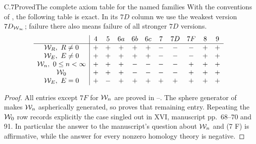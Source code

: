 \begin{claim}{C.7}{Proved}{The complete axiom table for the named families}
With the conventions of , the following table is exact.
In its $7D$ column we use the weakest version
$7D_{\mathcal{W}_{\infty}}$; failure there also means failure of all stronger
$7D$ versions.
\[
\begin{array}{c|cccccccccc}
 &4&5&6a&6b&6c&7&7D&7F&8&9\\\hline
\W_R,\ R\ne0&+&+&+&+&+&-&-&-&+&+\\
\W_E,\ E\ne0&+&+&+&+&+&-&-&-&+&+\\
\W_n,\ 0\leq n<\infty&+&+&+&-&-&-&-&+&+&+\\
\W_0&+&+&+&-&-&-&-&+&+&+\\
\W_E,\ E=0&+&-&+&+&+&+&+&+&+&+
\end{array}
\]
\end{claim}
\begin{proof}
All entries except $7F$ for $\mathcal{W}_n$ are proved in
--. The sphere generator of
 makes $\mathcal{W}_n$ aspherically generated, so
 proves that remaining entry. Repeating the $\mathcal{W}_0$
row records explicitly the case singled out in XVI, manuscript
pp.~68--70 and 91. In particular the answer to the manuscript's
question about $\mathcal{W}_n$ and (7 F) is affirmative, while the answer
for every nonzero homology theory is negative.
\end{proof}

